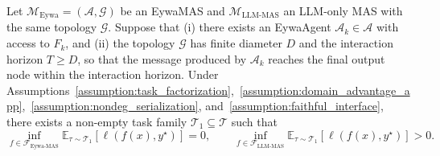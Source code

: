 \begin{theorem}
\label{thm:eywamas_app}
Let $\mathcal{M}_{\mathrm{Eywa}}=(\mathcal{A},\mathcal{G})$ be an EywaMAS and $\mathcal{M}_{\mathrm{LLM\text{-}MAS}}$ an LLM-only MAS with the same topology $\mathcal{G}$. Suppose that (i) there exists an EywaAgent $\mathcal{A}_k\in\mathcal{A}$ with access to $F_k$, and (ii) the topology $\mathcal{G}$ has finite diameter $D$ and the interaction horizon $T\ge D$, so that the message produced by $\mathcal{A}_k$ reaches the final output node within the interaction horizon. Under Assumptions~\ref{assumption:task_factorization},~\ref{assumption:domain_advantage_app},~\ref{assumption:nondeg_serialization}, and~\ref{assumption:faithful_interface}, there exists a non-empty task family $\mathcal{T}_1\subseteq\mathcal{T}$ such that
\begin{equation}
\inf_{f\in\mathcal{F}_{\mathrm{Eywa\text{-}MAS}}}\mathbb{E}_{\tau\sim\mathcal{T}_1}[\ell(f(x),y^\star)] = 0,
\qquad
\inf_{f\in\mathcal{F}_{\mathrm{LLM\text{-}MAS}}}\mathbb{E}_{\tau\sim\mathcal{T}_1}[\ell(f(x),y^\star)] > 0.
\end{equation}
\end{theorem}
